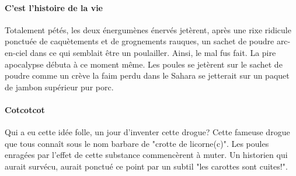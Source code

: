 \documentclass[a4paper, 11pt]{book}
\begin{document}
\paragraph{C'est l'histoire de la vie}
Totalement pétés, les deux énergumènes énervés jetèrent, après une rixe ridicule ponctuée de caquètements et de grognements rauques, un sachet de poudre arc-en-ciel dans ce qui semblait être un poulailler. Ainsi, le mal fus fait. La pire apocalypse débuta à ce moment même. Les poules se jetèrent sur le sachet de poudre comme un crève la faim perdu dans le Sahara se jetterait sur un paquet de jambon supérieur pur porc. 
\paragraph{Cotcotcot}
Qui a eu cette idée folle, un jour d'inventer cette drogue? Cette fameuse drogue que tous connaît sous le nom barbare de "crotte de licorne(c)". Les poules enragées par l'effet de cette substance commencèrent à muter. Un historien qui aurait survécu, aurait ponctué ce point par un subtil "les carottes sont cuites!". 


\end{document}
